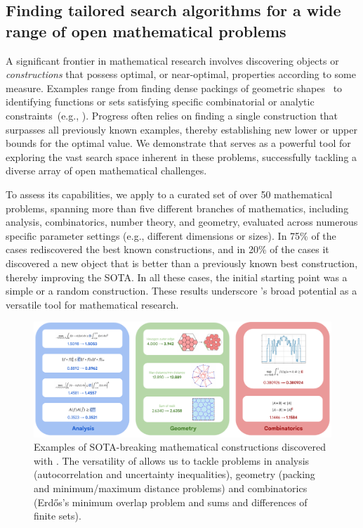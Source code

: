 \subsection{Finding tailored search algorithms for a wide range of open mathematical problems}
\label{subsec:math}

A significant frontier in mathematical research involves discovering objects or \textit{constructions} that possess optimal, or near-optimal, properties according to some measure. Examples range from finding dense packings of geometric shapes~\cite{geometry_collection} to identifying functions or sets satisfying specific combinatorial or analytic constraints~(e.g., \cite{matolcsi2010improved, vinuesa2010generalized, haugland2016minimum, gyarmati2007sums}). Progress often relies on finding a single construction that surpasses all previously known examples, thereby establishing new lower or upper bounds for the optimal value. We demonstrate that \method serves as a powerful tool for exploring the vast search space inherent in these problems, successfully tackling a diverse array of open mathematical challenges.

To assess its capabilities, we apply \method to a curated set of over 50 mathematical problems, spanning more than five different branches of mathematics, including analysis, combinatorics, number theory, and geometry, evaluated across numerous specific parameter settings (e.g., different dimensions or sizes). In 75\% of the cases \method rediscovered the best known constructions, and in 20\% of the cases it discovered a new object that is better than a previously known best construction, thereby improving the SOTA. In all these cases, the initial starting point was a simple or a random construction. These results underscore \method's broad potential as a versatile tool for mathematical research.

\begin{figure}[t]
    \centering
    \includegraphics[width=1.0\textwidth]{figures/math_results.pdf}
    \caption{Examples of SOTA-breaking mathematical constructions discovered with \method. The versatility of \method allows us to tackle problems in analysis (autocorrelation and uncertainty inequalities), geometry (packing and minimum/maximum distance problems) and combinatorics (Erd\H{o}s's minimum overlap problem and sums and differences of finite sets).}
    \label{fig:math_sota_examples}
\end{figure}

